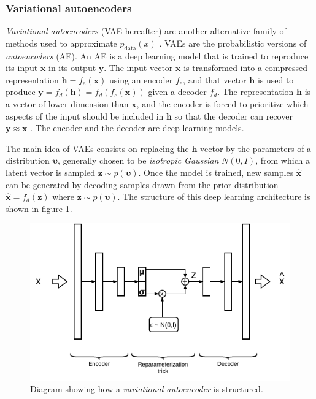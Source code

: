 \subsubsection{Variational autoencoders}
\textit{Variational autoencoders} (VAE hereafter) are another alternative family of methods used to approximate $p_\mathrm{data}(x)$ \autocite{kingma2019}. VAEs are the probabilistic versions of \textit{autoencoders} (AE). An AE is a deep learning model that is trained to reproduce its input $\mathbf{x}$ in its output $\mathbf{y}$. The input vector $\mathbf{x}$ is transformed into a compressed representation $\mathbf{h}=f_e(\mathbf{x})$ using an encoder $f_e$, and that vector $\mathbf{h}$ is used to produce $\mathbf{y}=f_d(\mathbf{h})=f_d(f_e(\mathbf{x}))$ given a decoder $f_d$. The representation $\mathbf{h}$ is a vector of lower dimension than $\mathbf{x}$, and the encoder is forced to prioritize which aspects of the input should be included in $\mathbf{h}$ so that the decoder can recover $\mathbf{y}\approx \mathbf{x}$ \autocite{Goodfellow2016}. The encoder and the decoder are deep learning models.

The main idea of VAEs consists on replacing the $\mathbf{h}$ vector by the parameters of a distribution $\mathbf{\upsilon}$, generally chosen to be \textit{isotropic Gaussian} $N(0,I)$, from which a latent vector is sampled $\mathbf{z} \sim p(\mathbf{\upsilon})$. Once the model is trained, new samples $\mathbf{\hat{x}}$ can be generated by decoding samples drawn from the prior distribution $\mathbf{\hat{x}} = f_d(\mathbf{z})$ where $\mathbf{z} \sim p(\mathbf{\upsilon})$. The structure of this deep learning architecture is shown in figure \ref{fig:vae}.

\begin{figure}
	\centering
	\includegraphics[width=0.7\linewidth]{chapter2/images/vae}
	\caption{Diagram showing how a \textit{variational autoencoder} is structured. }
	\label{fig:vae}
\end{figure}



